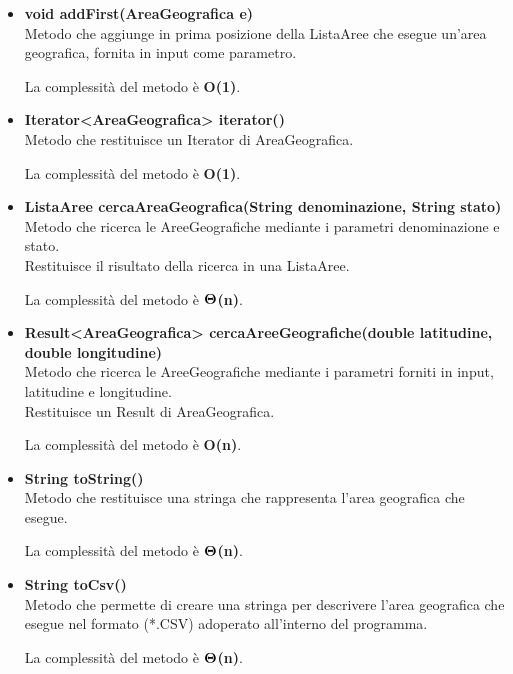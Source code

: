 \documentclass[a4paper, 12pt]{scrreprt}
\begin{document}
\begin{itemize}
				\item \textbf{void addFirst(AreaGeografica e)}
				\\Metodo che aggiunge in prima posizione della ListaAree che esegue un'area geografica, fornita in input come parametro.
				
				La complessit\`a del metodo è \textbf{O(1)}.
				
				\item \textbf{Iterator<AreaGeografica> iterator()}
				\\Metodo che restituisce un Iterator di AreaGeografica.
				
				La complessit\`a del metodo è \textbf{O(1)}.
				
				\item \textbf{ListaAree cercaAreaGeografica(String denominazione, String stato)}
				\\Metodo che ricerca le AreeGeografiche mediante i parametri denominazione e stato.
				\\Restituisce il risultato della ricerca in una ListaAree.
				
				La complessit\`a del metodo \`e $\mathbf{\Theta}$\textbf{(n)}.
				
				\item \textbf{Result<AreaGeografica> cercaAreeGeografiche(double latitudine, double longitudine)}
				\\Metodo che ricerca le AreeGeografiche mediante i parametri forniti in input, latitudine e longitudine.
				\\Restituisce un Result di AreaGeografica.
				
				La complessit\`a del metodo è \textbf{O(n)}.
				
				\item \textbf{String toString()}
				\\Metodo che restituisce una stringa che rappresenta l'area geografica che esegue.
				
				La complessit\`a del metodo \`e $\mathbf{\Theta}$\textbf{(n)}.
				
				\item \textbf{String toCsv()}
				\\Metodo che permette di creare una stringa per descrivere l'area geografica che esegue nel formato (*.CSV) adoperato all'interno del programma.
				
				La complessit\`a del metodo \`e $\mathbf{\Theta}$\textbf{(n)}.
				
			\end{itemize}
\end{document}
